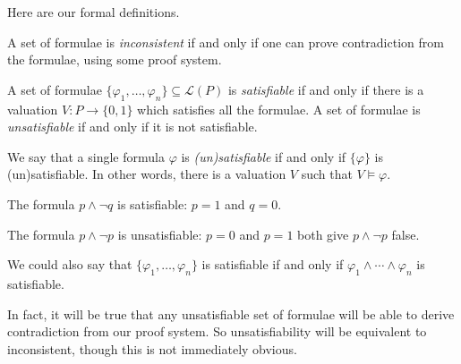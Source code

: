 Here are our formal definitions.
\begin{definition}[Inconsistent]
	A set of formulae is \textit{inconsistent} if and only if one can prove contradiction from the formulae, using some proof system.
\end{definition}
\begin{definition}[Satisfiable]
	A set of formulae $\{\varphi_1,\ldots,\varphi_n\}\subseteq\mathcal L(P)$ is \textit{satisfiable} if and only if there is a valuation $V:P\to\{0,1\}$ which satisfies all the formulae. A set of formulae is \textit{unsatisfiable} if and only if it is not satisfiable.

	We say that a single formula $\varphi$ is \textit{(un)satisfiable} if and only if $\{\varphi\}$ is (un)satisfiable. In other words, there is a valuation $V$ such that $V\models\varphi$.
\end{definition}
\begin{example}
	The formula $p\land\lnot q$ is satisfiable: $p=1$ and $q=0$.
\end{example}
\begin{example}
	The formula $p\land\lnot p$ is unsatisfiable: $p=0$ and $p=1$ both give $p\land\lnot p$ false.
\end{example}
We could also say that $\{\varphi_1,\ldots,\varphi_n\}$ is satisfiable if and only if $\varphi_1\land\cdots\land\varphi_n$ is satisfiable.
\begin{remark}
	In fact, it will be true that any unsatisfiable set of formulae will be able to derive contradiction from our proof system. So unsatisfiability will be equivalent to inconsistent, though this is not immediately obvious.
\end{remark}

